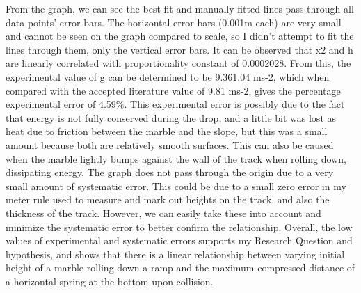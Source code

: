 From the graph, we can see the best fit and manually fitted lines pass through all data points’ error bars. The horizontal error bars (0.001m each) are very small and cannot be seen on the graph compared to scale, so I didn’t attempt to fit the lines through them, only the vertical error bars. 
It can be observed that x2 and h are linearly correlated with proportionality constant of 0.0002028. From this, the experimental value of g can be determined to be 9.361.04 ms-2, which when compared with the accepted literature value of 9.81 ms-2, gives the percentage experimental error of 4.59\%. This experimental error is possibly due to the fact that energy is not fully conserved during the drop, and a little bit was lost as heat due to friction between the marble and the slope, but this was a small amount because both are relatively smooth surfaces. This can also be caused when the marble lightly bumps against the wall of the track when rolling down, dissipating energy. The graph does not pass through the origin due to a very small amount of systematic error. This could be due to a small zero error in my meter rule used to measure and mark out heights on the track, and also the thickness of the track. However, we can easily take these into account and minimize the systematic error to better confirm the relationship. Overall, the low values of experimental and systematic errors supports my Research Question and hypothesis, and shows that there is a linear relationship between varying initial height of a marble rolling down a ramp and the maximum compressed distance of a horizontal spring at the bottom upon collision.
